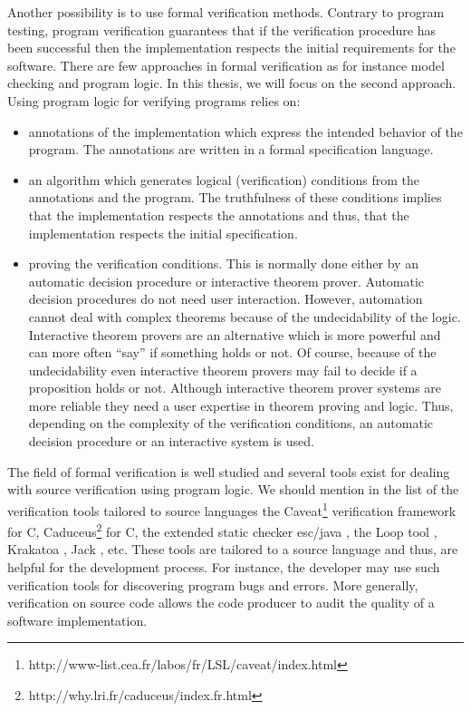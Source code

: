  Another possibility is to use formal verification methods. 
Contrary to program testing,  program verification guarantees that if the verification procedure  
has been successful then the implementation respects the initial requirements for the software. There are few approaches 
in formal verification as for instance model checking and program logic. In this thesis, we will focus on the second approach. 
Using program logic for verifying programs  relies on:
\begin{itemize} 
   \item annotations of the implementation which express the intended behavior of the program. The annotations
         are written in a formal specification language. 
   \item an algorithm which  generates logical (verification) conditions  from the annotations and the program. 
         The truthfulness of these conditions implies that the implementation respects the annotations and thus,
	 that the implementation respects the initial specification. 
    
   \item proving the verification conditions. This is normally done either by an automatic decision 
         procedure or interactive theorem prover.
         Automatic decision procedures do not need user interaction.
         However, automation cannot deal with complex theorems because of the 
	  undecidability of the logic.
	 Interactive theorem provers are an alternative which is 
	 more powerful and can more often ``say'' if something holds or not. Of course, because of the undecidability 
	 even  interactive theorem provers may fail to decide if a proposition holds or not. Although interactive theorem prover
	 systems are more reliable they need a user expertise in theorem proving and logic. 
	 Thus, depending on the complexity of the verification conditions, an automatic decision procedure or an interactive system is used.

           
\end{itemize}

 The field of formal  verification is well studied and several  tools exist for
dealing with  source verification using program logic. We should mention in the list of the verification tools tailored to source languages
the Caveat\footnote{http://www-list.cea.fr/labos/fr/LSL/caveat/index.html} verification framework  for C,
 Caduceus\footnote{http://why.lri.fr/caduceus/index.fr.html} for C,  the extended static checker
esc/java \cite{escjava}, the Loop tool \cite{jacobs03java},
Krakatoa \cite{marche03krakatoa}, Jack \cite{BRL-JACK}, etc. These tools are tailored to a source language and thus,
 are helpful for the development process. For instance, the developer may use such verification tools for discovering program bugs and
 errors. More generally, verification on source code allows the code producer to audit the quality of a software implementation.
 
